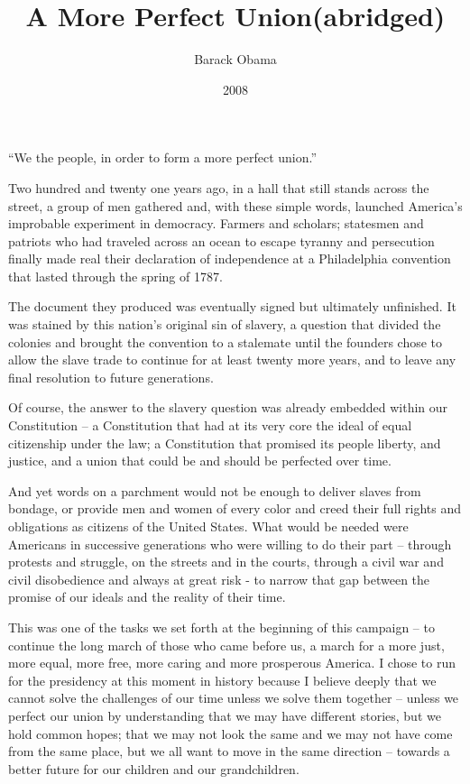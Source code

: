 \documentclass[10pt,a4paper]{article}
\newcommand{\subtitle}[1]{\vspace{10pt}\newline\normalsize\plantin #1}
\begin{document}
\title{A More Perfect Union\subtitle{(abridged)}}
\date{2008}
\author{Barack Obama}
\maketitle
    
\thispagestyle{plain}
\setcounter{page}{1}
\linenumbers
\noindent “We the people, in order to form a more perfect union.” 

Two hundred and twenty one years ago, in a hall that still stands across the street, a group of men gathered and, with these simple words, launched America’s improbable experiment in democracy. Farmers and scholars; statesmen and patriots who had traveled across an ocean to escape tyranny and persecution finally made real their declaration of independence at a Philadelphia convention that lasted through the spring of 1787.  

The document they produced was eventually signed but ultimately unfinished. It was stained by this nation’s original sin of slavery, a question that divided the colonies and brought the convention to a stalemate until the founders chose to allow the slave trade to continue for at least twenty more years, and to leave any final resolution to future generations. 

Of course, the answer to the slavery question was already embedded within our Constitution – a Constitution that had at its very core the ideal of equal citizenship under the law; a Constitution that promised its people liberty, and justice, and a union that could be and should be perfected over time. 

And yet words on a parchment would not be enough to deliver slaves from bondage, or provide men and women of every color and creed their full rights and obligations as citizens of the United States. What would be needed were Americans in successive generations who were willing to do their part – through protests and struggle, on the streets and in the courts, through a civil war and civil disobedience and always at great risk - to narrow that gap between the promise of our ideals and the reality of their time. 

This was one of the tasks we set forth at the beginning of this campaign – to continue the long march of those who came before us, a march for a more just, more equal, more free, more caring and more prosperous America. I chose to run for the presidency at this moment in history because I believe deeply that we cannot solve the challenges of our time unless we solve them together – unless we perfect our union by understanding that we may have different stories, but we hold common hopes; that we may not look the same and we may not have come from the same place, but we all want to move in the same direction – towards a better future for our children and our grandchildren. 
\end{document}
